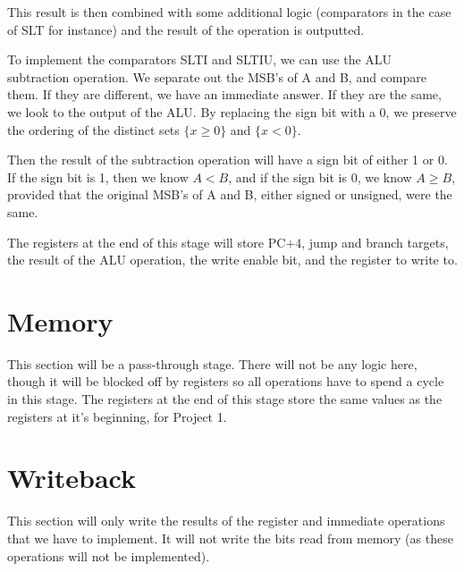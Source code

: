 \documentclass{article}
\begin{document}
This result is then combined with some additional logic (comparators in the case of SLT for instance) and the result of the operation is outputted.

To implement the comparators SLTI and SLTIU, we can use the ALU subtraction operation. We separate out the MSB's of A and B, and compare them. If they are different, we have an immediate answer. If they are the same, we look to the output of the ALU. By replacing the sign bit with a 0, we preserve the ordering of the distinct sets $\{x \geq 0\}$ and $\{x < 0\}$. 

Then the result of the subtraction operation will have a sign bit of either 1 or 0. If the sign bit is 1, then we know $A < B$, and if the sign bit is 0, we know $A \geq B$, provided that the original MSB's of A and B, either signed or unsigned, were the same. 

The registers at the end of this stage will store PC$+4$, jump and branch targets, the result of the ALU operation, the write enable bit, and the register to write to.

\section*{Memory}
This section will be a pass-through stage. There will not be any logic here, though it will be blocked off by registers so all operations have to spend a cycle in this stage. The registers at the end of this stage store the same values as the registers at it's beginning, for Project 1. 

\section*{Writeback}
This section will only write the results of the register and immediate operations that we have to implement.  It will not write the bits read from memory (as these operations will not be implemented).
\end{document}
